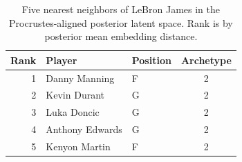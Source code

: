 \begin{table}[htbp]
  \centering\small
  \begin{tabular}{rllc}
    \toprule
    Rank & Player & Position & Archetype \\
    \midrule
    1 & Danny Manning & F & 2 \\
    2 & Kevin Durant & G & 2 \\
    3 & Luka Doncic & G & 2 \\
    4 & Anthony Edwards & G & 2 \\
    5 & Kenyon Martin & F & 2 \\
    \bottomrule
  \end{tabular}
  \caption{Five nearest neighbors of LeBron James in the Procrustes-aligned posterior latent space. Rank is by posterior mean embedding distance.}
  \label{tab:LeBron_James_neighbors}
\end{table}

